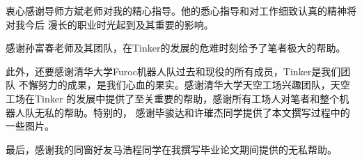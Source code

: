 
\begin{acknowledgements}
  衷心感谢导师方斌老师对我的精心指导。他的悉心指导和对工作细致认真的精神将对我今后
  漫长的职业时光起到及其重要的影响。
  
  感谢孙富春老师及其团队，在Tinker的发展的危难时刻给予了笔者极大的帮助。
  
  此外，还要感谢清华大学Furoc机器人队过去和现役的所有成员，Tinker是我们团队
  不懈努力的成果，是我们心血的果实。感谢清华大学天空工场兴趣团队，天空工场在Tinker
  的发展中提供了至关重要的帮助，感谢所有工场人对笔者和整个机器人队无私的帮助。特别的，
  感谢毕骏达和许璀杰同学提供了本文撰写过程中的一些图片。
  
  最后，感谢我的同窗好友马浩程同学在我撰写毕业论文期间提供的无私帮助。

\end{acknowledgements}
